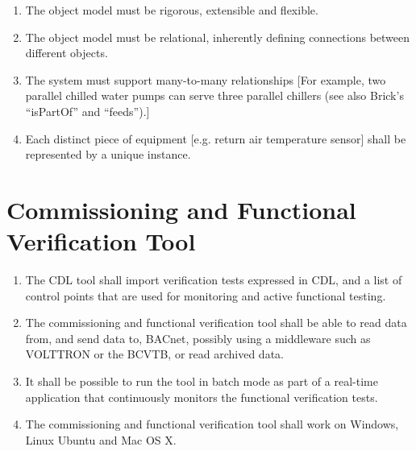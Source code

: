 \documentclass[letterpaper,10pt, openany,english]{sphinxmanual}
\begin{document}
\begin{enumerate}
\item {} 
The object model must be rigorous, extensible and flexible.

\item {} 
The object model must be relational, inherently defining connections between different objects.

\item {} 
The system must support many-to-many relationships {[}For example, two parallel chilled water pumps
can serve three parallel chillers (see also Brick’s “isPartOf” and “feeds”).{]}

\item {} 
Each distinct piece of equipment {[}e.g. return air temperature sensor{]}
shall be represented by a unique instance.

\end{enumerate}


\section{Commissioning and Functional Verification Tool}
\label{\detokenize{requirements:commissioning-and-functional-verification-tool}}\label{\detokenize{requirements:sec-requirements-verification-tool}}\begin{enumerate}
\def\theenumi{\arabic{enumi}}
\def\labelenumi{\theenumi .}
\makeatletter\def\p@enumii{\p@enumi \theenumi .}\makeatother
\item {} 
The CDL tool shall import verification tests expressed in CDL, and a list
of control points that are used for monitoring and active functional testing.

\item {} 
The commissioning and functional verification tool shall be able to
read data from, and send data to, BACnet, possibly using a middleware such as
VOLTTRON or the BCVTB, or read archived data.

\item {} 
It shall be possible to run the tool in batch mode as part of a real-time
application that continuously monitors the functional verification tests.

\item {} 
The commissioning and functional verification tool shall work
on Windows, Linux Ubuntu and Mac OS X.

\end{enumerate}
\end{document}
